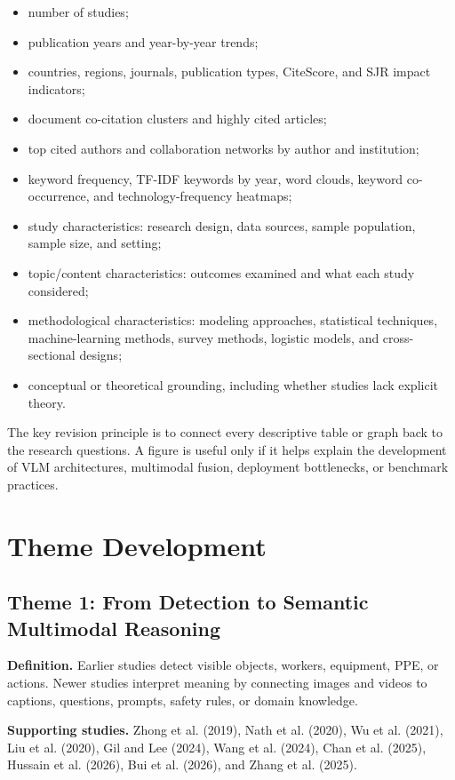 \documentclass[10pt,letterpaper]{article}
\begin{document}
\begin{itemize}
\item number of studies;
\item publication years and year-by-year trends;
\item countries, regions, journals, publication types, CiteScore, and SJR impact indicators;
\item document co-citation clusters and highly cited articles;
\item top cited authors and collaboration networks by author and institution;
\item keyword frequency, TF-IDF keywords by year, word clouds, keyword co-occurrence, and technology-frequency heatmaps;
\item study characteristics: research design, data sources, sample population, sample size, and setting;
\item topic/content characteristics: outcomes examined and what each study considered;
\item methodological characteristics: modeling approaches, statistical techniques, machine-learning methods, survey methods, logistic models, and cross-sectional designs;
\item conceptual or theoretical grounding, including whether studies lack explicit theory.
\end{itemize}

The key revision principle is to connect every descriptive table or graph back to the research questions. A figure is useful only if it helps explain the development of VLM architectures, multimodal fusion, deployment bottlenecks, or benchmark practices.

\section{Theme Development}

\subsection{Theme 1: From Detection to Semantic Multimodal Reasoning}

\textbf{Definition.} Earlier studies detect visible objects, workers, equipment, PPE, or actions. Newer studies interpret meaning by connecting images and videos to captions, questions, prompts, safety rules, or domain knowledge.

\textbf{Supporting studies.} Zhong et al. (2019), Nath et al. (2020), Wu et al. (2021), Liu et al. (2020), Gil and Lee (2024), Wang et al. (2024), Chan et al. (2025), Hussain et al. (2026), Bui et al. (2026), and Zhang et al. (2025).
\end{document}
